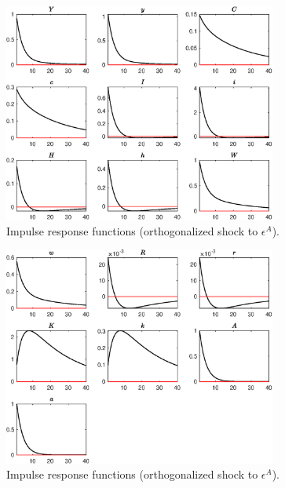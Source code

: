  
\begin{figure}[H]
\centering 
\includegraphics[width=0.80\textwidth]{RBC_basic/graphs/RBC_basic_IRF_epsA1}
\caption{Impulse response functions (orthogonalized shock to ${\epsilon^{A}}$).}\label{Fig:IRF:epsA:1}
\end{figure}
 
\begin{figure}[H]
\centering 
\includegraphics[width=0.80\textwidth]{RBC_basic/graphs/RBC_basic_IRF_epsA2}
\caption{Impulse response functions (orthogonalized shock to ${\epsilon^{A}}$).}\label{Fig:IRF:epsA:2}
\end{figure}
 
